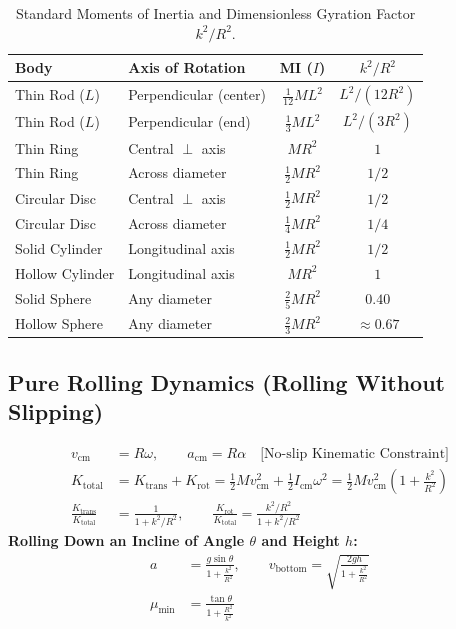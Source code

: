 \documentclass[10pt,twoside,openright]{book}
\begin{document}
\begin{table}[htbp]
\centering
\footnotesize
\setlength{\tabcolsep}{3pt}
\renewcommand{\arraystretch}{1.2}
\begin{tabularx}{\textwidth}{L L c c}
\toprule
\textbf{Body} & \textbf{Axis of Rotation} & \textbf{MI ($I$)} & $k^2/R^2$ \\
\midrule
Thin Rod ($L$) & Perpendicular (center) & $\frac{1}{12} M L^2$ & $L^2 / (12 R^2)$ \\
Thin Rod ($L$) & Perpendicular (end) & $\frac{1}{3} M L^2$ & $L^2 / (3 R^2)$ \\
Thin Ring & Central $\perp$ axis & $M R^2$ & $1$ \\
Thin Ring & Across diameter & $\frac{1}{2} M R^2$ & $1/2$ \\
Circular Disc & Central $\perp$ axis & $\frac{1}{2} M R^2$ & $1/2$ \\
Circular Disc & Across diameter & $\frac{1}{4} M R^2$ & $1/4$ \\
Solid Cylinder & Longitudinal axis & $\frac{1}{2} M R^2$ & $1/2$ \\
Hollow Cylinder & Longitudinal axis & $M R^2$ & $1$ \\
Solid Sphere & Any diameter & $\frac{2}{5} M R^2$ & $0.40$ \\
Hollow Sphere & Any diameter & $\frac{2}{3} M R^2$ & $\approx 0.67$ \\
\bottomrule
\end{tabularx}
\caption{Standard Moments of Inertia and Dimensionless Gyration Factor $k^2/R^2$.}
\end{table}

\subsection{Pure Rolling Dynamics (Rolling Without Slipping)}

\begin{formulabox}
\begin{align}
  v_{\text{cm}} &= R\omega, \qquad a_{\text{cm}} = R\alpha \quad \text{[No-slip Kinematic Constraint]} \\
  K_{\text{total}} &= K_{\text{trans}} + K_{\text{rot}} = \frac{1}{2}M v_{\text{cm}}^2 + \frac{1}{2}I_{\text{cm}}\omega^2 = \frac{1}{2}M v_{\text{cm}}^2\left(1 + \frac{k^2}{R^2}\right) \\
  \frac{K_{\text{trans}}}{K_{\text{total}}} &= \frac{1}{1 + k^2/R^2}, \qquad \frac{K_{\text{rot}}}{K_{\text{total}}} = \frac{k^2/R^2}{1 + k^2/R^2}
\end{align}
\textbf{Rolling Down an Incline of Angle $\theta$ and Height $h$:}
\begin{align}
  a &= \frac{g\sin\theta}{1 + \frac{k^2}{R^2}}, \qquad v_{\text{bottom}} = \sqrt{\frac{2gh}{1 + \frac{k^2}{R^2}}} \\
  \mu_{\min} &= \frac{\tan\theta}{1 + \frac{R^2}{k^2}}
\end{align}
\end{formulabox}
\end{document}
